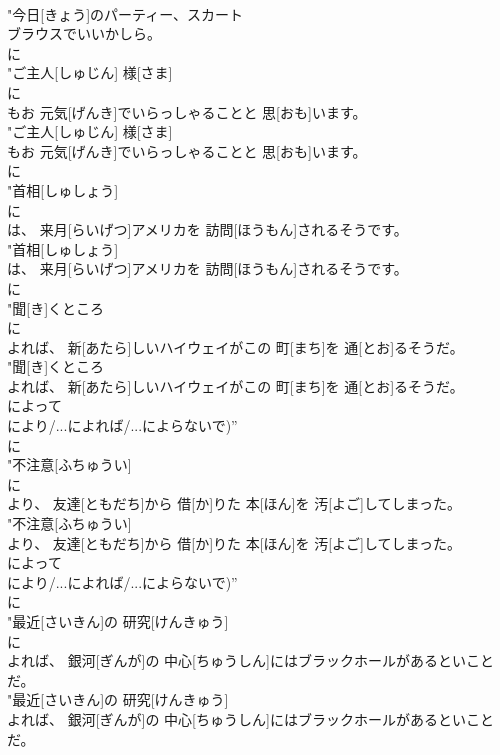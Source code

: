 \documentclass[8pt]{extreport}
\begin{document}
\begin{CJK}{UTF8}{min}
\\	"今日[きょう]のパーティー、スカート
\\	ブラウスでいいかしら。
\\	に
\\	"ご主人[しゅじん] 様[さま]
\\	に
\\	もお 元気[げんき]でいらっしゃることと 思[おも]います。
\\	"ご主人[しゅじん] 様[さま]
\\	もお 元気[げんき]でいらっしゃることと 思[おも]います。
\\	に
\\	"首相[しゅしょう]
\\	に
\\	は、 来月[らいげつ]アメリカを 訪問[ほうもん]されるそうです。
\\	"首相[しゅしょう]
\\	は、 来月[らいげつ]アメリカを 訪問[ほうもん]されるそうです。
\\	に
\\	"聞[き]くところ
\\	に
\\	よれば、 新[あたら]しいハイウェイがこの 町[まち]を 通[とお]るそうだ。
\\	"聞[き]くところ
\\	よれば、 新[あたら]しいハイウェイがこの 町[まち]を 通[とお]るそうだ。
\\	によって 
\\	により/...によれば/...によらないで)”	
\\	に
\\	"不注意[ふちゅうい]
\\	に
\\	より、 友達[ともだち]から 借[か]りた 本[ほん]を 汚[よご]してしまった。
\\	"不注意[ふちゅうい]
\\	より、 友達[ともだち]から 借[か]りた 本[ほん]を 汚[よご]してしまった。
\\	によって 
\\	により/...によれば/...によらないで)”	
\\	に
\\	"最近[さいきん]の 研究[けんきゅう]
\\	に
\\	よれば、 銀河[ぎんが]の 中心[ちゅうしん]にはブラックホールがあるといことだ。
\\	"最近[さいきん]の 研究[けんきゅう]
\\	よれば、 銀河[ぎんが]の 中心[ちゅうしん]にはブラックホールがあるといことだ。

\end{CJK}
\end{document}
